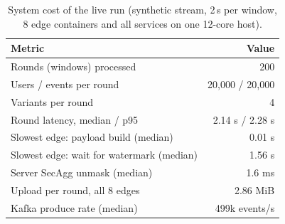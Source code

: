 \begin{table}[t]\centering\footnotesize
\caption{System cost of the live run (synthetic stream, 2\,s per window, 8 edge containers and all services on one 12-core host).}\label{tab:system}
\begin{tabular}{lr}\toprule Metric & Value\\\midrule
Rounds (windows) processed & 200\\
Users / events per round & 20,000 / 20,000\\
Variants per round & 4\\
Round latency, median / p95 & 2.14 s / 2.28 s\\
Slowest edge: payload build (median) & 0.01 s\\
Slowest edge: wait for watermark (median) & 1.56 s\\
Server SecAgg unmask (median) & 1.6 ms\\
Upload per round, all 8 edges & 2.86 MiB\\
Kafka produce rate (median) & 499k events/s\\
\bottomrule\end{tabular}\end{table}